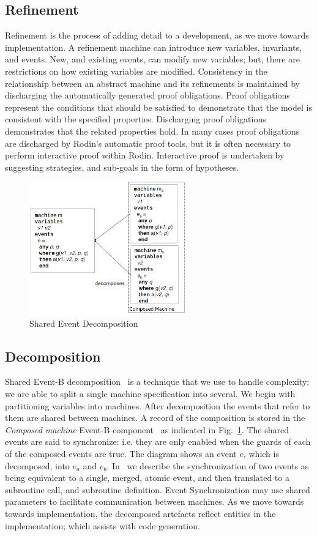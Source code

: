 \documentclass{llncs}%
\begin{document}
\subsection{Refinement}
Refinement is the process of adding detail to a development, as we move towards implementation. A refinement machine can introduce new variables, invariants, and events. New, and existing events, can modify new variables; but, there are restrictions on how existing variables are modified. Consistency in the relationship between an abstract machine and its refinements is maintained by discharging the automatically generated proof obligations. Proof obligations represent the conditions that should be satisfied to demonstrate that the model is consistent with the specified properties. Discharging proof obligations demonstrates that the related properties hold. In many cases proof obligations are discharged by Rodin's automatic proof tools, but it is often necessary to perform interactive proof within Rodin. Interactive proof is undertaken by suggesting strategies, and sub-goals in the form of hypotheses. 

\begin{figure}
\centering
\includegraphics[width=0.6\textwidth]{Decomp2.png}
\caption{Shared Event Decomposition}
\label{fig:Decomp2}
\end{figure}

\subsection{Decomposition}\label{decomp}
Shared Event-B decomposition~\cite{Butler09a,decomp2010b} is a technique that we use to handle complexity; we are able to split a single machine specification into several. We begin with partitioning variables into machines. After decomposition the events that refer to them are shared between machines. A record of the composition is stored in the \emph{Composed machine} Event-B component~\cite{decomp2010c} as indicated in Fig.~\ref{fig:Decomp2}.  The shared events are said to synchronize: i.e. they are only enabled when the guards of each of the composed events are true.  The diagram shows an event $e$, which is decomposed, into $e_a$ and $e_b$.
%
%
%
In~\cite{ae2011a} we describe the synchronization of two events as being equivalent to a single, merged, atomic event, and then translated to a subroutine call, and subroutine definition. Event Synchronization may use shared parameters to facilitate communication between machines.   As we move towards towards implementation, the decomposed artefacts reflect entities in the implementation; which assists with code generation.
\end{document}
